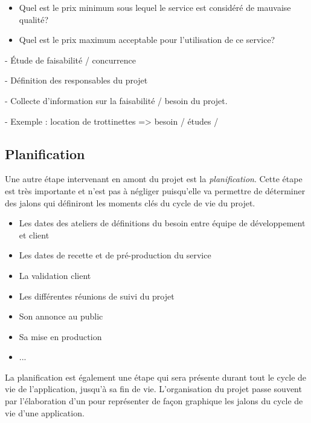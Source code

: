 \begin{itemize}
	\item Quel est le prix minimum sous lequel le service est considéré de mauvaise qualité?
	\item Quel est le prix maximum acceptable pour l'utilisation de ce service?
\end{itemize}


- Étude de faisabilité / concurrence

- Définition des responsables du projet

- Collecte d'information sur la faisabilité / besoin du projet.

- Exemple : location de trottinettes => besoin / études /


\subsection{Planification}

Une autre étape intervenant en amont du projet est la \emph{planification}. Cette étape est très importante et n'est pas à négliger puisqu'elle va permettre de déterminer des jalons qui définiront les moments clés du cycle de vie du projet.

\begin{itemize}
	\item Les dates des ateliers de définitions du besoin entre équipe de développement et client
	\item Les dates de recette et de pré-production du service
	\item La validation client
	\item Les différentes réunions de suivi du projet 
	\item Son annonce au public
	\item Sa mise en production
	\item ...
\end{itemize}

La planification est également une étape qui sera présente durant tout le cycle de vie de l'application, jusqu’à sa fin de vie. L'organisation du projet passe souvent par l'élaboration d'un  pour représenter de façon graphique les jalons du cycle de vie d'une application.

